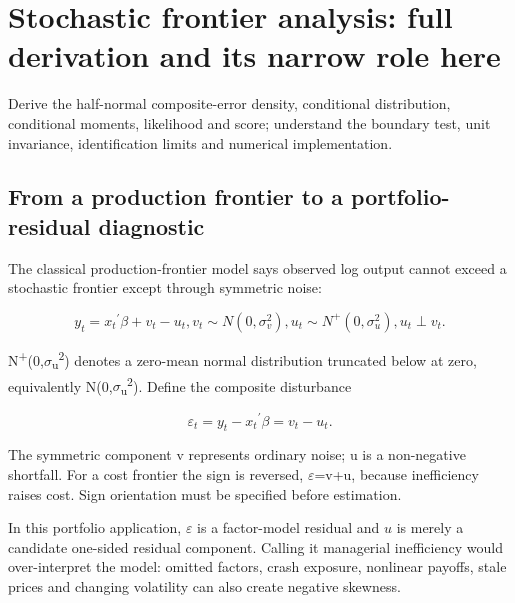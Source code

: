 \hypertarget{sfa}{}
\hypertarget{stochastic-frontier-analysis-full-derivation-and-its-narrow-role-here}{%
\chapter{Stochastic frontier analysis: full derivation and its narrow
role
here}\label{stochastic-frontier-analysis-full-derivation-and-its-narrow-role-here}}

Derive the half-normal composite-error density, conditional
distribution, conditional moments, likelihood and score; understand the
boundary test, unit invariance, identification limits and numerical
implementation.

\hypertarget{from-a-production-frontier-to-a-portfolio-residual-diagnostic}{%
\section{From a production frontier to a portfolio-residual
diagnostic}\label{from-a-production-frontier-to-a-portfolio-residual-diagnostic}}

The classical production-frontier model says observed log output cannot
exceed a stochastic frontier except through symmetric noise:

\begin{equation}
y_{t} = x_{t}{}^{\prime}\beta  + v_{t} - u_{t}, v_{t} \sim N(0,\sigma _{v}^{2}), u_{t} \sim N^{+}(0,\sigma _{u}^{2}), u_{t} \perp  v_{t}.
\end{equation}

N\textsuperscript{+}(0,\ensuremath{\sigma }\textsubscript{u}\textsuperscript{2}) denotes a zero-mean normal
distribution truncated below at zero, equivalently
\textbar N(0,\ensuremath{\sigma }\textsubscript{u}\textsuperscript{2})\textbar. Define the composite
disturbance

\begin{equation}
\varepsilon _{t} = y_{t}-x_{t}{}^{\prime}\beta  = v_{t}-u_{t}.
\end{equation}

The symmetric component v represents ordinary noise; u is a non-negative
shortfall. For a cost frontier the sign is reversed, \ensuremath{\varepsilon }=v+u, because
inefficiency raises cost. Sign orientation must be specified before
estimation.

In this portfolio application, $\varepsilon$ is a factor-model residual and
$u$ is merely a candidate one-sided residual component. Calling it
managerial inefficiency would over-interpret the model: omitted factors,
crash exposure, nonlinear payoffs, stale prices and changing volatility can
also create negative skewness.

